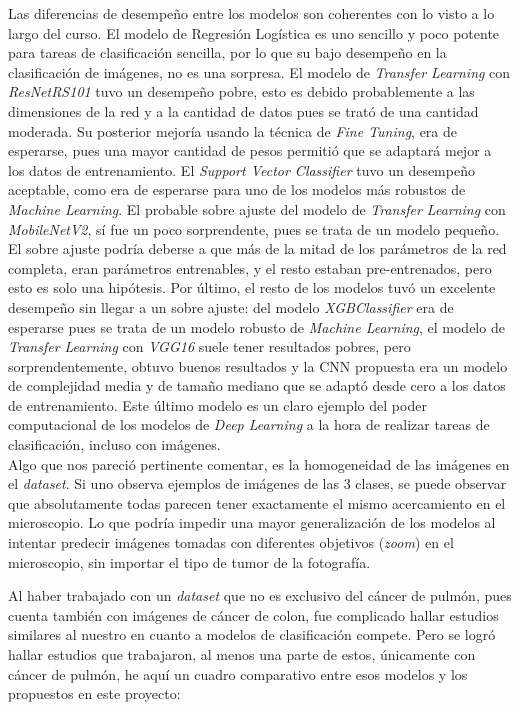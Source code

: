 Las diferencias de desempeño entre los modelos son coherentes con lo visto a lo largo del curso. El modelo de Regresión Logística es uno sencillo y poco potente para tareas de clasificación sencilla, por lo que su bajo desempeño en la clasificación de imágenes, no es una sorpresa. El modelo de \textit{Transfer Learning} con \textit{ResNetRS101} tuvo un desempeño pobre, esto es debido probablemente a las dimensiones de la red y a la cantidad de datos pues se trató de una cantidad moderada. Su posterior mejoría usando la técnica de \textit{Fine Tuning}, era de esperarse, pues una mayor cantidad de pesos permitió que se adaptará mejor a los datos de entrenamiento. El \textit{Support Vector Classifier} tuvo un desempeño aceptable, como era de esperarse para uno de los modelos más robustos de \textit{Machine Learning}. El probable sobre ajuste del modelo de \textit{Transfer Learning} con \textit{MobileNetV2}, sí fue un poco sorprendente, pues se trata de un modelo pequeño. El sobre ajuste podría deberse a que más de la mitad de los parámetros de la red completa, eran parámetros entrenables, y el resto estaban pre-entrenados, pero esto es solo una hipótesis. Por último, el resto de los modelos tuvó un excelente desempeño sin llegar a un sobre ajuste: del modelo \textit{XGBClassifier} era de esperarse pues se trata de un modelo robusto de \textit{Machine Learning}, el modelo de \textit{Transfer Learning} con \textit{VGG16} suele tener resultados pobres, pero sorprendentemente, obtuvo buenos resultados y la CNN propuesta era un modelo de complejidad media y de tamaño mediano que se adaptó desde cero a los datos de entrenamiento. Este último modelo es un claro ejemplo del poder computacional de los modelos de \textit{Deep Learning} a la hora de realizar tareas de clasificación, incluso con imágenes. \\

Algo que nos pareció pertinente comentar, es la homogeneidad de las imágenes en el \textit{dataset}. Si uno observa ejemplos de imágenes de las 3 clases, se puede observar que absolutamente todas parecen tener exactamente el mismo acercamiento en el microscopio. Lo que podría impedir una mayor generalización de los modelos al intentar predecir imágenes tomadas con diferentes objetivos (\textit{zoom}) en el microscopio, sin importar el tipo de tumor de la fotografía. \\

\newpage

Al haber trabajado con un \textit{dataset} que no es exclusivo del cáncer de pulmón, pues cuenta también con imágenes de cáncer de colon, fue complicado hallar estudios similares al nuestro en cuanto a modelos de clasificación compete. Pero se logró hallar estudios que trabajaron, al menos una parte de estos, únicamente con cáncer de pulmón, he aquí un cuadro comparativo entre esos modelos y los propuestos en este proyecto:

